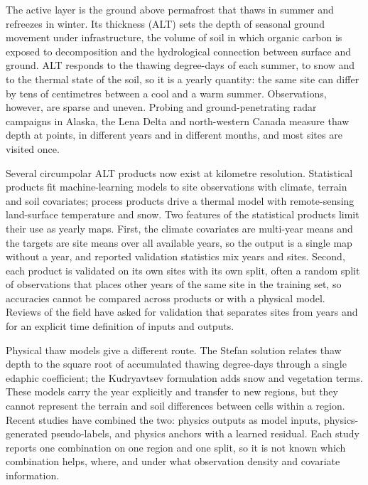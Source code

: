 The active layer is the ground above permafrost that thaws in summer and refreezes in winter. Its thickness (ALT) sets the depth of seasonal ground movement under infrastructure, the volume of soil in which organic carbon is exposed to decomposition and the hydrological connection between surface and ground\cite{Biskaborn2019,ShiklomanovNelson2002}. ALT responds to the thawing degree-days of each summer, to snow and to the thermal state of the soil, so it is a yearly quantity: the same site can differ by tens of centimetres between a cool and a warm summer\cite{Nelson1997,Klene2001}. Observations, however, are sparse and uneven. Probing and ground-penetrating radar campaigns in Alaska, the Lena Delta and north-western Canada measure thaw depth at points, in different years and in different months, and most sites are visited once\cite{Streletskiy2025,Boike2024}.

Several circumpolar ALT products now exist at kilometre resolution. Statistical products fit machine-learning models to site observations with climate, terrain and soil covariates\cite{Aalto2018,Ran2022a,Wei2026,Liu2024}; process products drive a thermal model with remote-sensing land-surface temperature and snow\cite{Westermann2024,YiKimball2019}. Two features of the statistical products limit their use as yearly maps. First, the climate covariates are multi-year means and the targets are site means over all available years, so the output is a single map without a year, and reported validation statistics mix years and sites. Second, each product is validated on its own sites with its own split, often a random split of observations that places other years of the same site in the training set, so accuracies cannot be compared across products or with a physical model\cite{Roberts2017,Ploton2020,MeyerPebesma2022}. Reviews of the field have asked for validation that separates sites from years and for an explicit time definition of inputs and outputs\cite{Wadoux2021,Linnenbrink2024}.

Physical thaw models give a different route. The Stefan solution relates thaw depth to the square root of accumulated thawing degree-days through a single edaphic coefficient\cite{Stefan1891,RomanovskyOsterkamp1997,Riseborough2008}; the Kudryavtsev formulation adds snow and vegetation terms\cite{Kudryavtsev1974}. These models carry the year explicitly and transfer to new regions, but they cannot represent the terrain and soil differences between cells within a region. Recent studies have combined the two: physics outputs as model inputs, physics-generated pseudo-labels, and physics anchors with a learned residual\cite{Willard2022,Pilyugina2025,Gautam2025}. Each study reports one combination on one region and one split, so it is not known which combination helps, where, and under what observation density and covariate information.

